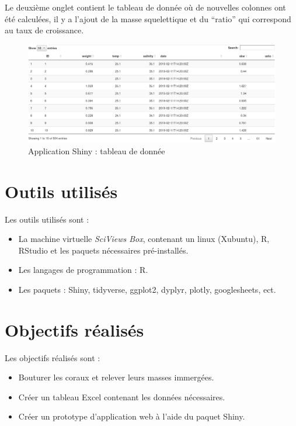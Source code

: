 \documentclass[]{report}
\begin{document}
Le deuxième onglet contient le tableau de donnée où de nouvelles
colonnes ont été calculées, il y a l'ajout de la masse squelettique et
du ``ratio'' qui correspond au taux de croissance.

\begin{figure}[h!]
\includegraphics[]{../image/shiny8.PNG}
\caption{Application Shiny : tableau de donnée}
\end{figure}

\section{Outils utilisés}\label{outils-utilises}

Les outils utilisés sont :

\begin{itemize}
\item
  La machine virtuelle \emph{SciViews Box}, contenant un linux
  (Xubuntu), R, RStudio et les paquets nécessaires pré-installés.
\item
  Les langages de programmation : R.
\item
  Les paquets : Shiny, tidyverse, ggplot2, dyplyr, plotly, googlesheets,
  ect.
\end{itemize}

\section{Objectifs réalisés}\label{objectifs-realises}

Les objectifs réalisés sont :

\begin{itemize}
\item
  Bouturer les coraux et relever leurs masses immergées.
\item
  Créer un tableau Excel contenant les données nécessaires.
\item
  Créer un prototype d'application web à l'aide du paquet Shiny.
\end{itemize}
\end{document}

